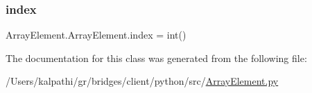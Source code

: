 \subsubsection{\texorpdfstring{index}{index}}
{\footnotesize\ttfamily Array\+Element.\+Array\+Element.\+index = int()\hspace{0.3cm}{\ttfamily [static]}}



The documentation for this class was generated from the following file\+:\begin{DoxyCompactItemize}
\item 
/\+Users/kalpathi/gr/bridges/client/python/src/\hyperlink{_array_element_8py}{Array\+Element.\+py}\end{DoxyCompactItemize}
